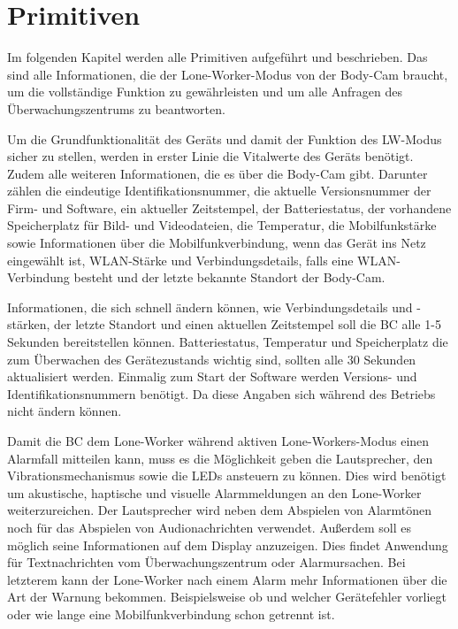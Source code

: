 \documentclass[thesis.tex]{subfiles}
\begin{document}

\section{Primitiven}\label{chap:primitiven}
Im folgenden Kapitel werden alle Primitiven aufgeführt und beschrieben.
Das sind alle Informationen, die der Lone-Worker-Modus von der Body-Cam braucht, um die vollständige Funktion zu gewährleisten
und um alle Anfragen des Überwachungszentrums zu beantworten.

Um die Grundfunktionalität des Geräts und damit der Funktion des LW-Modus sicher zu stellen, werden in erster Linie
die Vitalwerte des Geräts benötigt.
Zudem alle weiteren Informationen, die es über die Body-Cam gibt.
Darunter zählen die eindeutige Identifikationsnummer, die aktuelle Versionsnummer der Firm- und Software,
ein aktueller Zeitstempel, der Batteriestatus, der vorhandene Speicherplatz für Bild- und Videodateien,
die Temperatur, die Mobilfunkstärke sowie Informationen über die Mobilfunkverbindung,
wenn das Gerät ins Netz eingewählt ist, WLAN-Stärke und Verbindungsdetails, falls eine WLAN-Verbindung besteht und
der letzte bekannte Standort der Body-Cam.

Informationen, die sich schnell ändern können, wie Verbindungsdetails und -stärken, der letzte Standort und
einen aktuellen Zeitstempel soll die BC alle 1-5 Sekunden bereitstellen können.
Batteriestatus, Temperatur und Speicherplatz die zum Überwachen des Gerätezustands wichtig sind, sollten alle 30 Sekunden aktualisiert werden.
Einmalig zum Start der Software werden Versions- und Identifikationsnummern benötigt.
Da diese Angaben sich während des Betriebs nicht ändern können.

Damit die BC dem Lone-Worker während aktiven Lone-Workers-Modus einen Alarmfall mitteilen kann,
muss es die Möglichkeit geben die Lautsprecher, den Vibrationsmechanismus sowie die LEDs ansteuern zu können.
Dies wird benötigt um akustische, haptische und visuelle Alarmmeldungen an den Lone-Worker weiterzureichen.
Der Lautsprecher wird neben dem Abspielen von Alarmtönen noch für das Abspielen von Audionachrichten verwendet.
Außerdem soll es möglich seine Informationen auf dem Display anzuzeigen.
Dies findet Anwendung für Textnachrichten vom Überwachungszentrum oder Alarmursachen.
Bei letzterem kann der Lone-Worker nach einem Alarm mehr Informationen über die Art der Warnung bekommen.
Beispielsweise ob und welcher Gerätefehler vorliegt oder wie lange eine Mobilfunkverbindung schon getrennt ist.
\end{document}
